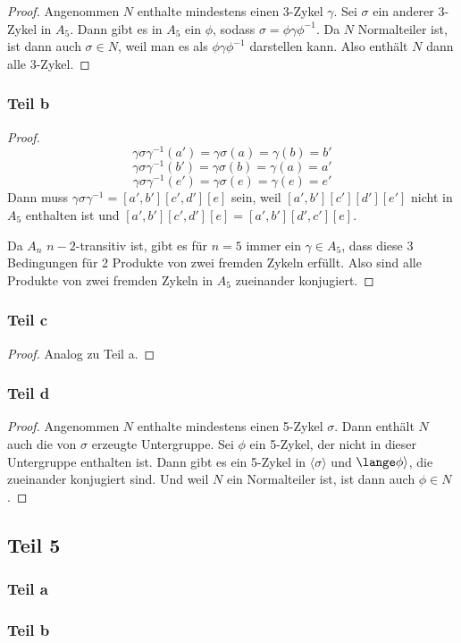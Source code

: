 \documentclass[10pt,a4paper]{article}
\begin{document}
\begin{proof}
  Angenommen $N$ enthalte mindestens einen 3-Zykel $\gamma$.
  Sei $\sigma$ ein anderer 3-Zykel in $A_{5}$.
  Dann gibt es in $A_{5}$ ein $\phi$, sodass $\sigma = \phi\gamma\phi^{-1}$.
  Da $N$ Normalteiler ist, ist dann auch $\sigma \in N$, weil man es als $\phi\gamma\phi^{-1}$ darstellen kann.
  Also enthält $N$ dann alle 3-Zykel.
\end{proof}

\subsubsection{Teil b}

\begin{proof}
  \begin{equation}
    \gamma\sigma\gamma^{-1}(a') = \gamma\sigma(a) = \gamma(b) = b'
  \end{equation}
  \begin{equation}
    \gamma\sigma\gamma^{-1}(b') = \gamma\sigma(b) = \gamma(a) = a'
  \end{equation}
  \begin{equation}
    \gamma\sigma\gamma^{-1}(e') = \gamma\sigma(e) = \gamma(e) = e'
  \end{equation}
  Dann muss $\gamma\sigma\gamma^{-1} = [a', b'][c', d'][e]$ sein, weil $[a', b'][c'][d'][e']$ nicht in $A_{5}$ enthalten ist und $[a', b'][c', d'][e] = [a', b'][d', c'][e]$.

  Da $A_{n}$ $n - 2$-transitiv ist, gibt es für $n = 5$ immer ein $\gamma \in A_{5}$, dass diese 3 Bedingungen für 2 Produkte von zwei fremden Zykeln erfüllt.
  Also sind alle Produkte von zwei fremden Zykeln in $A_{5}$ zueinander konjugiert.
\end{proof}

\subsubsection{Teil c}

\begin{proof}
  Analog zu Teil a.
\end{proof}

\subsubsection{Teil d}

\begin{proof}
  Angenommen $N$ enthalte mindestens einen 5-Zykel $\sigma$.
  Dann enthält $N$ auch die von $\sigma$ erzeugte Untergruppe.
  Sei $\phi$ ein 5-Zykel, der nicht in dieser Untergruppe enthalten ist.
  Dann gibt es ein 5-Zykel in $\langle \sigma \rangle$ und $\lange \phi \rangle$, die zueinander konjugiert sind.
  Und weil $N$ ein Normalteiler ist, ist dann auch $\phi \in N$.
\end{proof}

\subsection{Teil 5}

\subsubsection{Teil a}

\subsubsection{Teil b}
\end{document}
